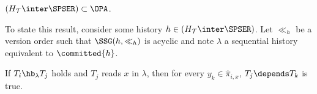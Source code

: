 


\begin{proposition}
  $(H_{\mathcal{T}} \inter \SPSER) \subset \OPA$.
\end{proposition}

To state this result, consider some history $h \in (H_{\mathcal{T}} \inter \SPSER)$.
Let $\ll_h$ be a version order such that $\SSG(h,\ll_h)$ is acyclic and note $\lambda$ a sequential history equivalent to $\committed{h}$.

\begin{lemma}
  If $T_i \hb_{\lambda} T_j$ holds and $T_j$ reads $x$ in $\lambda$, then for every $y_k \in \hat{\pi}_{i,x}$, $T_j \depends T_k$ is true.
\end{lemma}

